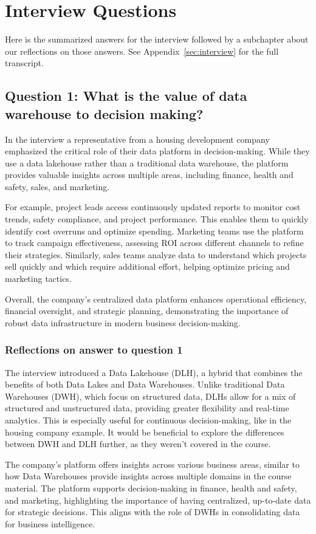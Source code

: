 \section{Interview Questions}
Here is the summarized answers for the interview followed by a subchapter about our reflections on those answers. See Appendix~\ref{sec:interview} for the full transcript.
\subsection{Question 1: What is the value of data warehouse to decision making?}

In the interview a representative from a housing development company emphasized the critical role of their data platform 
in decision-making. While they use a data lakehouse rather than a traditional data warehouse, the platform provides valuable 
insights across multiple areas, including finance, health and safety, sales, and marketing.

For example, project leads access continuously updated reports to monitor cost trends, safety compliance, and project performance. 
This enables them to quickly identify cost overruns and optimize spending. Marketing teams use the platform to track campaign 
effectiveness, assessing ROI across different channels to refine their strategies. Similarly, sales teams analyze data to understand 
which projects sell quickly and which require additional effort, helping optimize pricing and marketing tactics.

Overall, the company's centralized data platform enhances operational efficiency, financial oversight, and strategic planning, 
demonstrating the importance of robust data infrastructure in modern business decision-making.
\subsubsection{Reflections on answer to question 1}
The interview introduced a Data Lakehouse (DLH), a hybrid that combines the benefits of both Data Lakes and Data Warehouses. 
Unlike traditional Data Warehouses (DWH), which focus on structured data, DLHs allow for a mix of structured and unstructured data, 
providing greater flexibility and real-time analytics. This is especially useful for continuous decision-making, like in the housing company example. 
It would be beneficial to explore the differences between DWH and DLH further, as they weren't covered in the course.

The company's platform offers insights across various business areas, similar to how Data Warehouses provide insights across multiple domains in the course material. 
The platform supports decision-making in finance, health and safety, and marketing, highlighting the importance of having centralized, up-to-date data for strategic decisions. 
This aligns with the role of DWHs in consolidating data for business intelligence.

